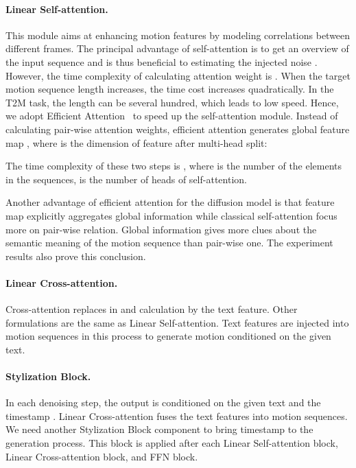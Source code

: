 \paragraph{Linear Self-attention.} This module aims at enhancing motion features by modeling correlations between different frames. The principal advantage of self-attention is to get an overview of the input sequence and is thus beneficial to estimating the injected noise . However, the time complexity of calculating attention weight  is . When the target motion sequence length increases, the time cost increases quadratically. In the T2M task, the length can be several hundred, which leads to low speed. Hence, we adopt Efficient Attention~\citep{shen2021efficient} to speed up the self-attention module. Instead of calculating pair-wise attention weights, efficient attention generates global feature map , where  is the dimension of feature after multi-head split:

The time complexity of these two steps is , where  is the number of the elements in the sequences,  is the number of heads of self-attention.



Another advantage of efficient attention for the diffusion model is that feature map  explicitly aggregates global information while classical self-attention focus more on pair-wise relation. Global information gives more clues about the semantic meaning of the motion sequence than pair-wise one. The experiment results also prove this conclusion.

\paragraph{Linear Cross-attention.} Cross-attention replaces  in  and  calculation by the text feature. Other formulations are the same as Linear Self-attention. Text features are injected into motion sequences in this process to generate motion conditioned on the given text. 

\paragraph{Stylization Block.} In each denoising step, the output is conditioned on the given text and the timestamp . Linear Cross-attention fuses the text features into motion sequences. We need another Stylization Block component to bring timestamp  to the generation process. This block is applied after each Linear Self-attention block, Linear Cross-attention block, and FFN block.

